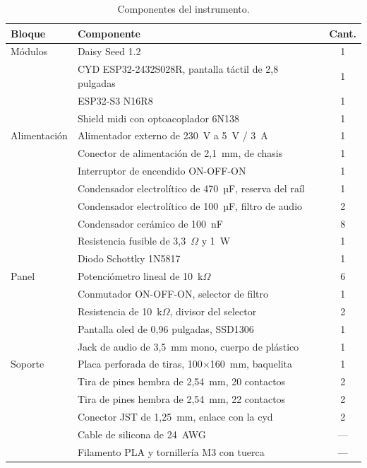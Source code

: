 \begin{table}[htbp]
    \centering
    \caption{Componentes del instrumento.}
    \label{tab:materiales}
    \begin{tabular}{llc}
        \toprule
        \textbf{Bloque} & \textbf{Componente} & \textbf{Cant.} \\
        \midrule
        Módulos
          & Daisy Seed 1.2 & 1 \\
          & CYD ESP32-2432S028R, pantalla táctil de 2,8 pulgadas & 1 \\
          & ESP32-S3 N16R8 & 1 \\
          & Shield \gls{midi} con optoacoplador 6N138 & 1 \\
        \midrule
        Alimentación
          & Alimentador externo de 230~V a 5~V / 3~A & 1 \\
          & Conector de alimentación de 2,1~mm, de chasis & 1 \\
          & Interruptor de encendido ON-OFF-ON & 1 \\
          & Condensador electrolítico de 470~µF, reserva del raíl & 1 \\
          & Condensador electrolítico de 100~µF, filtro de audio & 2 \\
          & Condensador cerámico de 100~nF & 8 \\
          & Resistencia fusible de 3,3~$\Omega$ y 1~W & 1 \\
          & Diodo Schottky 1N5817 & 1 \\
        \midrule
        Panel
          & Potenciómetro lineal de 10~k$\Omega$ & 6 \\
          & Conmutador ON-OFF-ON, selector de filtro & 1 \\
          & Resistencia de 10~k$\Omega$, divisor del selector & 2 \\
          & Pantalla \gls{oled} de 0,96 pulgadas, SSD1306 & 1 \\
          & Jack de audio de 3,5~mm mono, cuerpo de plástico & 1 \\
        \midrule
        Soporte
          & Placa perforada de tiras, 100$\times$160~mm, baquelita & 1 \\
          & Tira de pines hembra de 2,54~mm, 20 contactos & 2 \\
          & Tira de pines hembra de 2,54~mm, 22 contactos & 2 \\
          & Conector JST de 1,25~mm, enlace con la \gls{cyd} & 2 \\
          & Cable de silicona de 24~AWG & --- \\
          & Filamento PLA y tornillería M3 con tuerca & --- \\
        \bottomrule
    \end{tabular}
\end{table}

